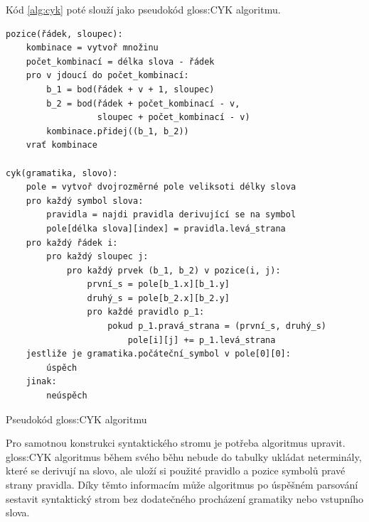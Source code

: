 	Kód \ref{alg:cyk} poté slouží jako pseudokód \gls{gloss:CYK} algoritmu.
	
	\begin{listing}
		\begin{verbatim}
pozice(řádek, sloupec):
	kombinace = vytvoř množinu
	počet_kombinací = délka slova - řádek
	pro v jdoucí do počet_kombinací:
		b_1 = bod(řádek + v + 1, sloupec)
		b_2 = bod(řádek + počet_kombinací - v, 
		          sloupec + počet_kombinací - v)
		kombinace.přidej((b_1, b_2))
	vrať kombinace
	
cyk(gramatika, slovo):
	pole = vytvoř dvojrozměrné pole veliksoti délky slova
	pro každý symbol slova:
		pravidla = najdi pravidla derivující se na symbol
		pole[délka slova][index] = pravidla.levá_strana	
	pro každý řádek i:
		pro každý sloupec j:
			pro každý prvek (b_1, b_2) v pozice(i, j):
				první_s = pole[b_1.x][b_1.y]
				druhý_s = pole[b_2.x][b_2.y]		
				pro každé pravidlo p_1:
					pokud p_1.pravá_strana = (první_s, druhý_s)
						pole[i][j] += p_1.levá_strana
	jestliže je gramatika.počáteční_symbol v pole[0][0]:
		úspěch
	jinak:
		neúspěch
		\end{verbatim}
		\caption{Pseudokód \gls{gloss:CYK} algoritmu}
		\label{alg:cyk}
	\end{listing}
	
	Pro samotnou konstrukci syntaktického stromu je potřeba algoritmus upravit. \gls{gloss:CYK} algoritmus během svého běhu nebude do tabulky ukládat neterminály, které se derivují na slovo, ale uloží si použité pravidlo a pozice symbolů pravé strany pravidla. Díky těmto informacím může algoritmus po úspěšném parsování sestavit syntaktický strom bez dodatečného procházení gramatiky nebo vstupního slova.
